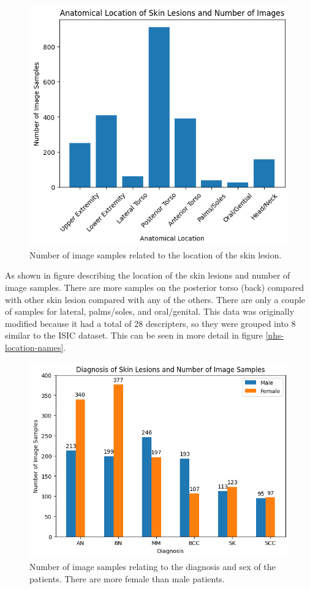 \begin{figure}
	\centering
	\includegraphics[scale=0.8]{images/nhs/nhs-location.png}
	\caption{Number of image samples related to the location of the skin lesion.} 
\end{figure} \label{nhs-location}

As shown in figure \cite{nhs-location} describing the location of the skin lesions and number of image samples. There are more samples on the posterior torso (back) compared with other skin lesion compared with any of the others. There are only a couple of samples for lateral, palms/soles, and oral/genital. This data was originally modified because it had a total of 28 descripters, so they were grouped into 8 similar to the ISIC dataset. This can be seen in more detail in figure \ref{nhs-location-names}.

\begin{figure}
	\centering
	\includegraphics[scale=0.8]{images/nhs/nhs-sex-diagnosis.png}
	\caption{Number of image samples relating to the diagnosis and sex of the patients. There are more female than male patients.} 
\end{figure} \label{nhs-sex-diagnosis}

